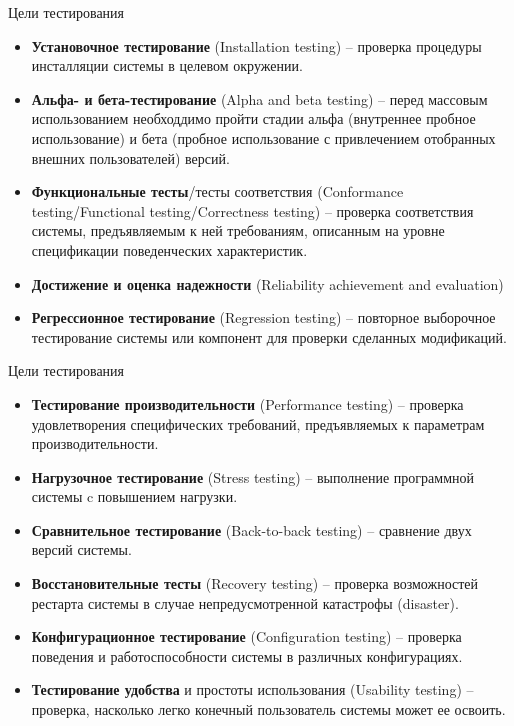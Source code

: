 \documentclass[xcolor=table]{beamer}
\begin{document}
\begin{frame}{Цели тестирования}
	\begin{itemize}
		\item \textbf{Установочное тестирование} (Installation testing) -- проверка процедуры инсталляции системы в целевом окружении.
		\item \textbf{Альфа- и бета-тестирование} (Alpha and beta testing) -- перед массовым использованием необходдимо пройти стадии альфа (внутреннее пробное использование) и бета (пробное использование с привлечением отобранных внешних пользователей) версий.
		\item \textbf{Функциональные тесты}/тесты соответствия 
(Conformance testing/Functional testing/Correctness testing) -- проверка соответствия системы, предъявляемым к ней требованиям, описанным на уровне спецификации поведенческих характеристик.
		\item \textbf{Достижение и оценка надежности} (Reliability achievement and evaluation)
		\item \textbf{Регрессионное тестирование} (Regression testing) -- повторное выборочное тестирование системы или компонент для проверки сделанных модификаций.
	\end{itemize}		 
\end{frame}

\begin{frame}{Цели тестирования}
	\begin{itemize}
		\item \textbf{Тестирование производительности} (Performance testing) --
проверка удовлетворения специфических требований, предъявляемых к параметрам производительности.	
		\item \textbf{Нагрузочное тестирование} (Stress testing) -- выполнение программной системы c повышением нагрузки.
		\item \textbf{Сравнительное тестирование} (Back-to-back testing) -- сравнение двух версий системы.		
		\item \textbf{Восстановительные тесты} (Recovery testing) -- проверка возможностей рестарта системы в случае непредусмотренной катастрофы (disaster).		
		\item \textbf{Конфигурационное тестирование} (Configuration testing) -- проверка поведения и работоспособности системы в различных конфигурациях.
		\item\textbf{Тестирование удобства} и простоты использования (Usability testing) -- проверка, насколько легко конечный пользователь системы может ее освоить.
	\end{itemize}		 
\end{frame}
\end{document}
